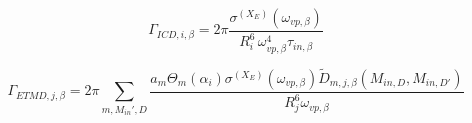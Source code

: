 \begin{equation}
 \Gamma_{ICD,i,\beta} = 2\pi
                        \frac{\sigma^{(X_E)}(\omega_{vp,\beta})}
                        {R_i^6 \, \omega_{vp,\beta}^4 \tau_{in,\beta}}
\end{equation}


\begin{equation}
 \Gamma_{ETMD,j,\beta} = 2\pi \sum\limits_{m,M_{in}',D}
                        \frac{a_m \Theta_m(\alpha_i) \sigma^{(X_E)}(\omega_{vp,\beta})
                              \tilde{D}_{m,j,\beta}(M_{in,D},M_{in,D'})}
                         {R_j^6 \omega_{vp,\beta}}
\end{equation}


\begin{equation}
\end{equation}


\begin{equation}
\end{equation}


\begin{equation}
\end{equation}


\begin{equation}
\end{equation}


\begin{equation}
\end{equation}



\begin{equation}
\end{equation}


